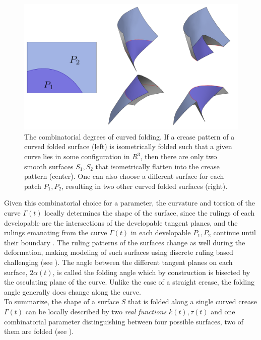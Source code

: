 \begin{figure} [h]
	\centering
	\includegraphics[width=\linewidth]{figures/curved_fold_through_curve.png}
	\caption{The combinatorial degrees of curved folding. If a crease pattern of a curved folded surface (left) is isometrically folded such that a given curve lies in some configuration in $R^3$, then there are only two smooth surfaces $S_1,S_2$ that isometrically flatten into the crease pattern (center). One can also choose a different surface for each patch $P_1,P_2$, resulting in two other curved folded surfaces (right).}
	\label{fig:folding_combinatorics}
\end{figure}
Given this combinatorial choice for a parameter, the curvature and torsion of the curve $\Gamma(t)$ locally determines the shape of the surface, since the rulings of each developable are the intersections of the developable tangent planes, and the rulings emanating from the curve $\Gamma(t)$ in each developable $P_1,P_2$ continue until their boundary \cite{spivak,more_on_paper}. The ruling patterns of the surfaces change as well during the deformation, making modeling of such surfaces using discrete ruling based challenging (see ). The angle between the different tangent planes on each surface, $2\alpha(t)$, is called the folding angle which by construction is bisected by the osculating plane of the curve. Unlike the case of a straight crease, the folding angle generally does change along the curve. \\

To summarize, the shape of a surface $S$ that is folded along a single curved crease $\Gamma(t)$ can be locally described by two \textit{real functions} $k(t),\tau(t)$ and one combinatorial parameter distinguishing between four possible surfaces, two of them are folded (see ).
 
